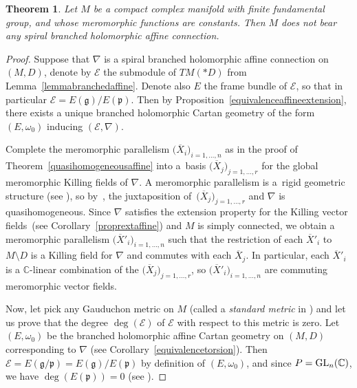 \documentclass[pdftex]{sigma}
\numberwithin{equation}{section}
\newtheorem{Theorem}{Theorem}[section]
\begin{document}
\begin{Theorem}\label{classificationaffine} Let $M$ be a compact complex manifold with finite fundamental group, and whose meromorphic functions are constants. Then $M$ does not bear any spiral branched holomorphic affine connection.
\end{Theorem}
\begin{proof} Suppose that $\nabla$ is a spiral branched holomorphic affine connection on $(M,D)$, denote by $\mathcal{E}$ the submodule of $TM(* D)$ from Lemma~\ref{lemmabranchedaffine}. Denote also $E$ the frame bundle of $\mathcal{E}$, so that in particular $\mathcal{E}=E(\mathfrak{g})/E(\mathfrak{p})$. Then by Proposition~\ref{equivalenceaffineextension}, there exists a unique branched holomorphic Cartan geometry of the form $(E,\omega_0)$ inducing $(\mathcal{E},\nabla)$.

Complete the meromorphic parallelism $\big(\overline{X}_i\big)_{i=1,\dots,n}$ as in the proof of Theorem~\ref{quasihomogeneousaffine} into a~basis $\big(\overline{X}_j\big)_{j=1,\dots,r}$ for the global meromorphic Killing fields of $\nabla$. A meromorphic parallelism is a~rigid geometric structure (see \cite{DumitrescuQuasi}), so by~\cite[Theorem 2]{Dumitrescu0}, the juxtaposition of~$\big(\overline{X}_j\big)_{j=1,\dots,r}$ and $\nabla$ is quasihomogeneous. Since $\nabla$ satisfies the extension property for the Killing vector fields~(see Corollary~\ref{proprextaffine}) and $M$ is simply connected, we obtain a meromorphic parallelism $\big(\overline{X}'_i\big)_{i=1,\dots,n}$ such that the restriction of each $\overline{X}'_i$ to $M\setminus D$ is a Killing field for $\nabla$ and commutes with each $\overline{X}_j$. In particular, each $\overline{X}'_i$ is a $\mathbb{C}$-linear combination of the $\big(\overline{X}_j\big)_{j=1,\dots,r}$, so $\big(\overline{X}'_i\big)_{i=1,\dots,n}$ are commuting meromorphic vector fields.

Now, let pick any Gauduchon metric on $M$ (called a \textit{standard metric} in \cite[p.~502]{Gauduchon}) and let us prove that the degree $\deg (\mathcal{E})$ of $\mathcal{E}$ with respect to this metric is zero. Let $(E,\omega_0)$ be the branched holomorphic affine Cartan geometry on $(M,D)$ corresponding to $\nabla$ (see Corollary~\ref{equivalencetorsion}). Then $\mathcal{E}=E(\mathfrak{g}/\mathfrak{p})=E(\mathfrak{g})/E(\mathfrak{p})$ by definition of $(E,\omega_0)$, and since $P={\rm GL}_n(\mathbb{C})$, we have $\deg (E(\mathfrak{p}))=0$ (see \cite[Corollary 4.2]{BD}).


\end{proof}
\end{document}
